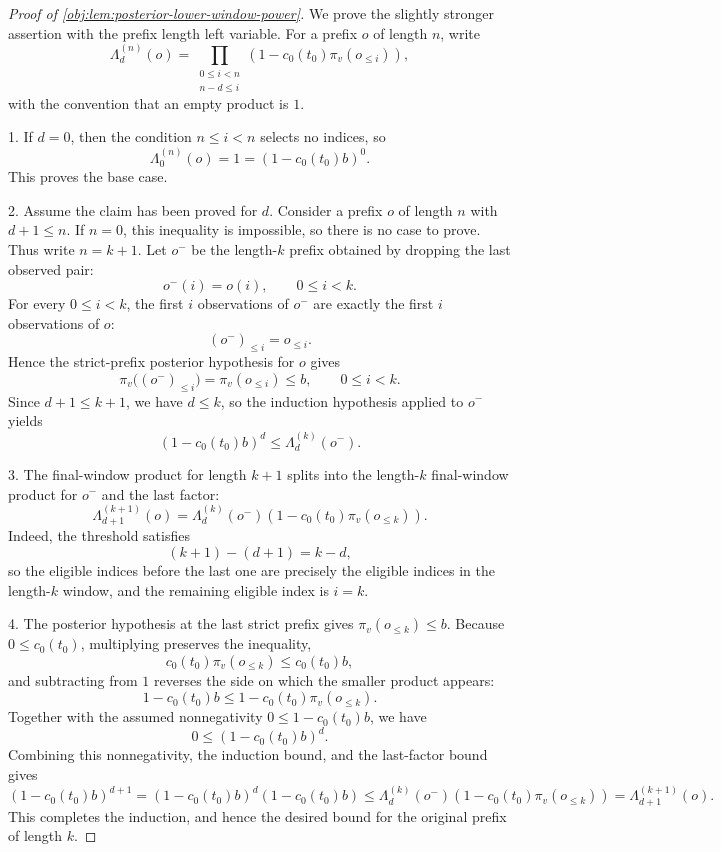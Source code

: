 \begin{proof}[Proof of \cref{obj:lem:posterior-lower-window-power}]
We prove the slightly stronger assertion with the prefix length left variable.  For a prefix
\(o\) of length \(n\), write
\[
\Lambda_d^{(n)}(o)
=
\prod_{\substack{0\le i<n\\ n-d\le i}}
\left(1-c_0(t_0)\pi_v(o_{\le i})\right),
\]
with the convention that an empty product is \(1\).

1. If \(d=0\), then the condition \(n\le i<n\) selects no indices, so
\[
\Lambda_0^{(n)}(o)=1=(1-c_0(t_0)b)^0 .
\]
This proves the base case. %

2. Assume the claim has been proved for \(d\).  Consider a prefix \(o\) of length \(n\) with
\(d+1\le n\).  If \(n=0\), this inequality is impossible, so there is no case to prove.  Thus write
\(n=k+1\).  Let \(o^{-}\) be the length-\(k\) prefix obtained by dropping the last observed pair:
\[
o^{-}(i)=o(i),\qquad 0\le i<k .
\]
For every \(0\le i<k\), the first \(i\) observations of \(o^{-}\) are exactly the first \(i\)
observations of \(o\):
\[
(o^{-})_{\le i}=o_{\le i}.
\]
Hence the strict-prefix posterior hypothesis for \(o\) gives
\[
\pi_v\bigl((o^{-})_{\le i}\bigr)=\pi_v(o_{\le i})\le b,
\qquad 0\le i<k .
\]
Since \(d+1\le k+1\), we have \(d\le k\), so the induction hypothesis applied to \(o^{-}\) yields
\[
(1-c_0(t_0)b)^d\le \Lambda_d^{(k)}(o^{-}).
\]

3. The final-window product for length \(k+1\) splits into the length-\(k\) final-window product
for \(o^{-}\) and the last factor:
\[
\Lambda_{d+1}^{(k+1)}(o)
=
\Lambda_d^{(k)}(o^{-})
\left(1-c_0(t_0)\pi_v(o_{\le k})\right).
\]
Indeed, the threshold satisfies
\[
(k+1)-(d+1)=k-d,
\]
so the eligible indices before the last one are precisely the eligible indices in the length-\(k\)
window, and the remaining eligible index is \(i=k\). %

4. The posterior hypothesis at the last strict prefix gives \(\pi_v(o_{\le k})\le b\).  Because
\(0\le c_0(t_0)\), multiplying preserves the inequality,
\[
c_0(t_0)\pi_v(o_{\le k})\le c_0(t_0)b,
\]
and subtracting from \(1\) reverses the side on which the smaller product appears:
\[
1-c_0(t_0)b\le 1-c_0(t_0)\pi_v(o_{\le k}).
\]
Together with the assumed nonnegativity \(0\le 1-c_0(t_0)b\), we have
\[
0\le (1-c_0(t_0)b)^d .
\]
Combining this nonnegativity, the induction bound, and the last-factor bound gives
\[
(1-c_0(t_0)b)^{d+1}
=
(1-c_0(t_0)b)^d(1-c_0(t_0)b)
\le
\Lambda_d^{(k)}(o^{-})
\left(1-c_0(t_0)\pi_v(o_{\le k})\right)
=
\Lambda_{d+1}^{(k+1)}(o).
\]
This completes the induction, and hence the desired bound for the original prefix of length \(k\). %
\end{proof}
